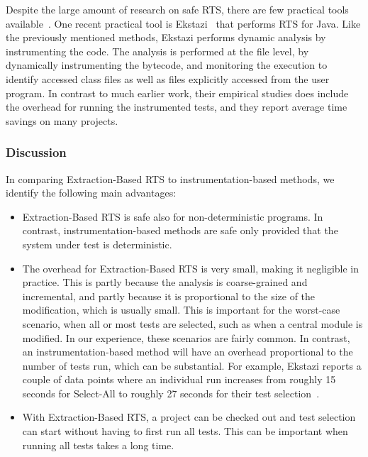 {Despite the large amount of research on safe RTS, there are few practical tools available~\cite{gligoric2014empirical}. One recent practical tool is Ekstazi~\cite{gligoric2015practical} that performs RTS for Java. Like the previously mentioned methods, Ekstazi performs dynamic analysis by instrumenting the code. The analysis is performed at the file level, by dynamically instrumenting the bytecode, and monitoring the execution to identify accessed class files as well as files explicitly accessed from the user program. In contrast to much earlier work, their empirical studies does include the overhead for running the instrumented tests, and they report average time savings on many projects. 

\subsubsection*{Discussion}

In comparing Extraction-Based RTS to instrumentation-based methods, we identify the following main advantages:
\begin{itemize}
\item Extraction-Based RTS is safe also for non-deterministic programs. In contrast, instrumentation-based methods are safe only provided that the system under test is deterministic.
\item The overhead for Extraction-Based RTS is very small, making it negligible in practice. This is
  partly because the analysis is coarse-grained and incremental, and partly because it is
  proportional to the size of the modification, which is usually small. This is important for the
  worst-case scenario, when all or most tests are selected, such as when a central module is modified. In our experience, these scenarios are fairly common. In contrast, an instrumentation-based method will have an overhead proportional to the number of tests run, which can be substantial. For example, Ekstazi reports a couple of data points where an individual run increases from roughly 15 seconds for Select-All to roughly 27 seconds for their test selection~\cite{gligoric2015practical}.
\item With Extraction-Based RTS, a project can be checked out and test selection can start without having to first run all tests. This can be important when running all tests takes a long time.
\end{itemize}

}
